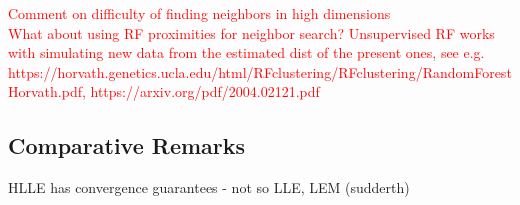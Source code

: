 \textcolor{red}{Comment on difficulty of finding neighbors in high dimensions}
\\
\textcolor{red}{What about using RF proximities for neighbor search? 
Unsupervised RF works with simulating new data from the estimated dist of the 
present ones, see e.g. https://horvath.genetics.ucla.edu/html/RFclustering/RFclustering/RandomForestHorvath.pdf, https://arxiv.org/pdf/2004.02121.pdf}


\subsection{Comparative Remarks}
\label{comparison}

HLLE has convergence guarantees - not so LLE, LEM (sudderth)
